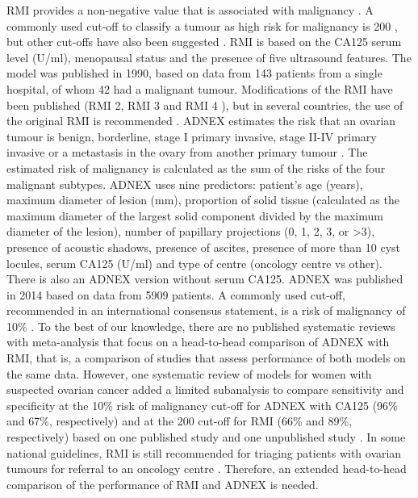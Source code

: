\gls{RMI} provides a non-negative value that is associated with malignancy
 \cite{jacobsRiskMalignancyIndex1990}. A commonly used cut-off to classify a tumour
as high risk for malignancy is 200
 \cite{OvarianMassesPremenopausal2016a,AggstockscancerMedEpitelial2023,staer-jensenBenigneCysterOvarienea,HandteringAfOvariecyster2016,OvarianCystsPostmenopausal2016},
but other cut-offs have also been suggested
 \cite{OvarianMassesPremenopausal2016a,sundarRiskpredictionModelsPostmenopausal2024,OvarianCancerRecognition2011}.
\gls{RMI} is based on the CA125 serum level (U/ml), menopausal status and the presence of
five ultrasound features. The model was published in 1990, based on data from 143
patients from a single hospital, of whom 42 had a malignant tumour. Modifications of
the \gls{RMI} have been published (\gls{RMI} 2, \gls{RMI} 3 and \gls{RMI} 4
 \cite{tingulstadEvaluationRiskMalignancy1996,yamamotoComparisonFourMalignancy2009,tingulstadRiskofmalignancyIndexEvaluate1999}),
but in several countries, the use of the original \gls{RMI} is recommended
 \cite{OvarianMassesPremenopausal2016a,AggstockscancerMedEpitelial2023,staer-jensenBenigneCysterOvarienea}.
\gls{ADNEX} estimates the risk that an ovarian tumour is benign, borderline, stage I
primary invasive, stage II-IV primary invasive or a metastasis in the ovary from
another primary tumour \cite{vancalsterEvaluatingRiskOvarian2014}. The estimated
risk of malignancy is calculated as the sum of the risks of the four malignant
subtypes. \gls{ADNEX} uses nine predictors: patient's age (years), maximum diameter of
lesion (mm), proportion of solid tissue (calculated as the maximum diameter of the
largest solid component divided by the maximum diameter of the lesion), number of
papillary projections (0, 1, 2, 3, or >3), presence of acoustic shadows, presence
of ascites, presence of more than 10 cyst locules, serum CA125 (U/ml) and type of
centre (oncology centre vs other). There is also an \gls{ADNEX} version without serum
CA125. \gls{ADNEX} was published in 2014 based on data from 5909 patients. A commonly
used cut-off, recommended in an international consensus statement, is a risk of
malignancy of 10\% \cite{timmermanESGOISUOGIOTA2021}. To the best of our knowledge,
there are no published systematic reviews with meta-analysis that focus on a
head-to-head comparison of \gls{ADNEX} with \gls{RMI}, that is, a comparison of studies that
assess performance of both models on the same data. However, one systematic review
of models for women with suspected ovarian cancer added a limited subanalysis to
compare sensitivity and specificity at the 10\% risk of malignancy cut-off for \gls{ADNEX}
with CA125 (96\% and 67\%, respectively) and at the 200 cut-off for \gls{RMI} (66\% and
89\%, respectively) based on one published study and one unpublished study
 \cite{westwoodRiskScoresGuide2018}. In some national guidelines, \gls{RMI} is still
recommended for triaging patients with ovarian tumours for referral to an oncology
centre
 \cite{OvarianMassesPremenopausal2016a,AggstockscancerMedEpitelial2023,staer-jensenBenigneCysterOvarienea,HandteringAfOvariecyster2016,OvarianCystsPostmenopausal2016,OvarianCancerRecognition2011}.
Therefore, an extended head-to-head comparison of the performance of \gls{RMI} and \gls{ADNEX}
is needed.

